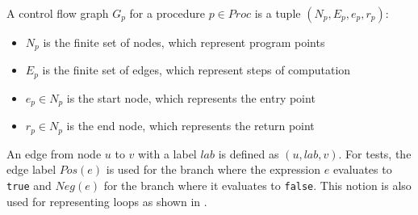 A control flow graph $G_p$ for a procedure $p \in Proc$ is a tuple $(N_p,E_p,e_p,r_p)$:
\begin{itemize}
\item $N_p$ is the finite set of nodes, which represent program points
\item $E_p$ is the finite set of edges, which represent steps of computation
\item $e_p \in N_p$ is the start node, which represents the entry point
\item $r_p \in N_p$ is the end node, which represents the return point
\end{itemize}
An edge from node $u$ to $v$ with a label $lab$ is defined as $(u, lab, v)$.
For tests, the edge label $Pos(e)$ is used for the branch where the expression $e$ evaluates to \verb|true| and $Neg(e)$ for the branch where it evaluates to \verb|false|. This notion is also used for representing loops as shown in .

